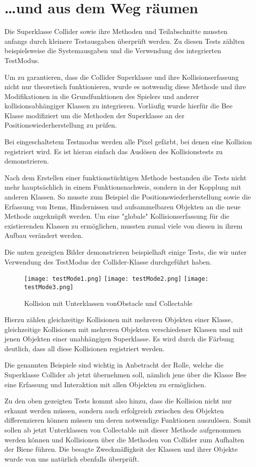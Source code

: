\documentclass{pi1}
\begin{document}
\section{\dots und aus dem Weg räumen}
Die Superklasse Collider  sowie ihre Methoden und Teilabschnitte mussten anfangs durch kleinere Testausgaben überprüft werden. Zu diesen Tests zählten beispielsweise die Systemausgaben und die Verwendung des integrierten TestModus.

Um zu garantieren, dass die Collider Superklasse und ihre Kollisionserfassung nicht nur theoretisch funktionieren, wurde es notwendig diese Methode und ihre Modifikationen in die Grundfunktionen des Spielers und anderer kollisionsabhängiger Klassen zu integrieren. Vorläufig wurde hierfür die Bee Klasse modifiziert um die Methoden der Superklasse an der Positionswiederherstellung zu prüfen.

Bei eingeschaltetem Testmodus werden alle Pixel gefärbt, bei denen eine Kollision registriert wird.
Es ist hieran einfach das Auslösen des Kollisionstests zu demonstrieren.

Nach dem Erstellen einer funktionstüchtigen Methode bestanden die Tests nicht mehr hauptsächlich in einem Funktionsnachweis, sondern in der Kopplung mit anderen Klassen. So musste zum Beispiel die Positionswiederherstellung sowie die Erfassung von Items, Hindernissen und aufsammelbaren Objekten an die neue Methode angeknüpft werden.
Um eine "globale" Kollisionserfassung für die existierenden Klassen zu ermöglichen, mussten zumal viele von diesen in ihrem Aufbau verändert werden.

Die unten gezeigten Bilder demonstrieren beispielhaft einige Tests, die wir unter Verwendung des TestModus der Collider-Klasse durchgeführt haben.

\begin{figure}[h]
	\texttt{[image: testMode1.png]}
	\texttt{[image: testMode2.png]}
	\texttt{[image: testMode3.png]}
	\caption{Kollision mit Unterklassen vonObstacle und Collectable}
	\label{bild1}
\end{figure}



Hierzu zählen gleichzeitige Kollisionen mit mehreren Objekten einer Klasse, gleichzeitige Kollisionen mit mehreren Objekten verschiedener Klassen und mit jenen Objekten einer unabhängigen Superklasse.
Es wird durch die Färbung deutlich, dass all diese Kollisionen registriert werden.


Die genannten Beispiele sind wichtig in Anbetracht der Rolle, welche die Superklasse Collider ab jetzt übernehmen soll, nämlich jene über die Klasse Bee eine Erfassung und Interaktion mit allen Objekten zu ermöglichen.\newline

Zu den oben gezeigten Tests kommt also hinzu, dass die Kollision nicht nur erkannt werden müssen, sondern auch erfolgreich zwischen den Objekten differenzieren können müssen um deren notwendige Funktionen auszulösen.
Somit sollen ab jetzt Unterklassen von Collectable mit dieser Methode aufgenommen werden können und Kollisionen über die Methoden von Collider zum Aufhalten der Biene führen.
Die besagte Zweckmäßigkeit der Klassen und ihrer Objekte wurde von uns natürlich ebenfalls überprüft.
\end{document}
